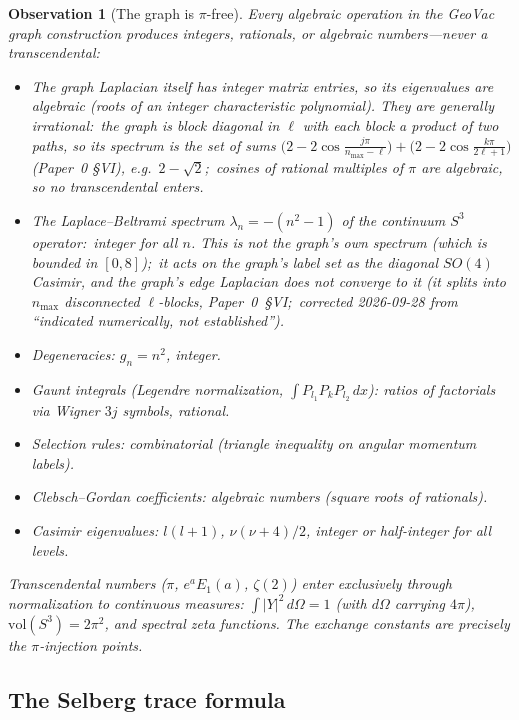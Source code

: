 \documentclass[aps,pra,twocolumn,superscriptaddress,longbibliography]{revtex4-2}
\newtheorem{observation}{Observation}
\begin{document}
\begin{observation}[The graph is $\pi$-free]
\label{obs:pi-free}
Every algebraic operation in the GeoVac graph construction
produces integers, rationals, or algebraic numbers---never a
transcendental:
\begin{itemize}
  \item The graph Laplacian itself has integer matrix entries, so its
    eigenvalues are algebraic (roots of an integer characteristic
    polynomial).  They are generally \emph{irrational}:\ the graph is
    block diagonal in $\ell$ with each block a product of two paths,
    so its spectrum is the set of sums
    $\bigl(2-2\cos\frac{j\pi}{n_{\max}-\ell}\bigr)+\bigl(2-2\cos\frac{k\pi}{2\ell+1}\bigr)$
    (Paper~0 \S VI), e.g.\ $2-\sqrt2$;\ cosines of rational multiples
    of $\pi$ are algebraic, so no transcendental enters.
  \item The Laplace--Beltrami spectrum $\lambda_n = -(n^2 - 1)$ of the
    \emph{continuum} $S^3$ operator:\ integer for all $n$.  This is not
    the graph's own spectrum (which is bounded in $[0,8]$);\ it acts on
    the graph's \emph{label set} as the diagonal $SO(4)$ Casimir, and the
    graph's edge Laplacian does \emph{not} converge to it (it splits into
    $n_{\max}$ disconnected $\ell$-blocks, Paper~0~\S VI;\ corrected
    2026-09-28 from ``indicated numerically, not established'').
  \item Degeneracies: $g_n = n^2$, integer.
  \item Gaunt integrals (Legendre normalization,
    $\int P_{l_1} P_k P_{l_2}\,dx$): ratios of factorials via
    Wigner $3j$ symbols, rational.
  \item Selection rules: combinatorial (triangle inequality on angular
    momentum labels).
  \item Clebsch--Gordan coefficients: algebraic numbers (square roots
    of rationals).
  \item Casimir eigenvalues: $l(l+1)$, $\nu(\nu+4)/2$, integer or
    half-integer for all levels.
\end{itemize}
Transcendental numbers ($\pi$, $e^a E_1(a)$, $\zeta(2)$) enter
exclusively through normalization to continuous measures:
$\int |Y|^2\,d\Omega = 1$ (with $d\Omega$ carrying $4\pi$),
$\mathrm{vol}(S^3) = 2\pi^2$, and spectral zeta functions.
The exchange constants are precisely the $\pi$-injection points.
\end{observation}

\subsection{The Selberg trace formula}
\end{document}
